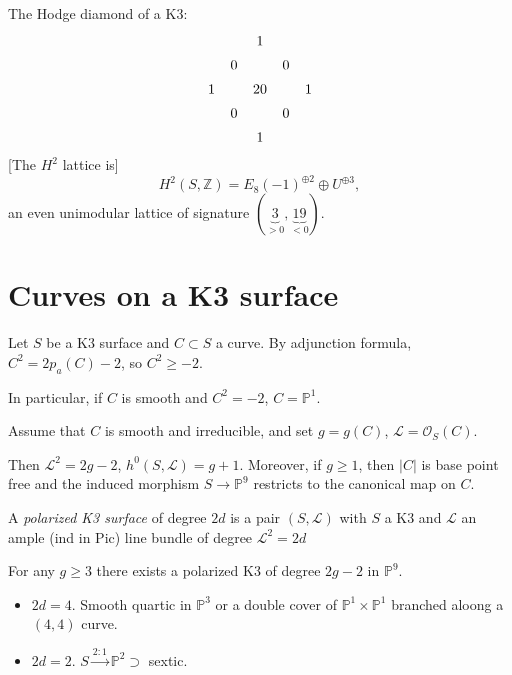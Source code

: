 \noindent
The Hodge diamond of a K3:
$$
\xymatrix@C=.5em@R=.5em{
& & 1\\
& 0 && 0\\
1 && 20 && 1\\
& 0 && 0\\
& & 1
}
$$
[The $H^2$ lattice is]
$$
H^2(S,\mathbb{Z})=E_8(-1)^{\oplus 2} \oplus
U^{\oplus 3},
$$
an even unimodular lattice of signature
$(\underbrace{3}_{>0},\underbrace{19}_{<0})$.

\section{Curves on a K3 surface}
\label{section-curves-on-k3}

Let $S$ be a K3 surface and $C \subset S$ a
curve.
By adjunction formula, $C^2=2p_a(C)-2$, so
$C^2 \geq -2$.

In particular, if $C$ is smooth and $C^2=-2$,
$C=\mathbb{P}^1$.

Assume that $C$ is smooth and irreducible,
and set $g=g(C)$,
$\mathcal{L}=\mathcal{O}_S(C)$.

Then $\mathcal{L}^2=2g-2$,
$h^0(S,\mathcal{L})=g+1$.
Moreover, if $g \geq 1$,
then $|C|$ is base point free and the induced
morphism
$S \to \mathbb{P}^9$ restricts to the
canonical map on $C$.

\begin{definition}
\label{definition-polarized-k3}
A {\it polarized K3 surface} of degree $2d$
is a pair
$(S,\mathcal{L})$ with $S$ a K3 and
$\mathcal{L}$ an
ample (ind in Pic) line bundle of degree
$\mathcal{L}^2=2d$
\end{definition}

\begin{proposition}
\label{proposition-polarized-k3}
For any $g \geq 3$ there exists a polarized
K3
of degree $2g-2$ in $\mathbb{P}^9$.
\end{proposition}

\begin{example}
\label{example-polarized-k3}
\begin{itemize}
\item $2d=4$. Smooth quartic in
$\mathbb{P}^3$
or a double cover of $\mathbb{P}^1 \times
\mathbb{P}^1$ branched
aloong a $(4,4)$ curve.

\item $2d=2$.  $S
\xrightarrow{2:1}\mathbb{P}^2 \supset$
sextic.
\end{itemize}
\end{example}

